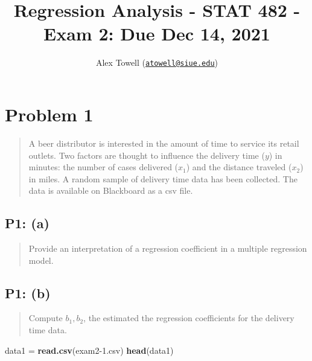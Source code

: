 \documentclass[
]{article}
\title{Regression Analysis - STAT 482 - Exam 2: Due Dec 14, 2021}
\author{Alex Towell
(\href{mailto:atowell@siue.edu}{\nolinkurl{atowell@siue.edu}})}
\date{}
\newenvironment{Shaded}{\begin{snugshade}}{\end{snugshade}}
\newcommand{\FunctionTok}[1]{\textcolor[rgb]{0.13,0.29,0.53}{\textbf{#1}}}
\newcommand{\NormalTok}[1]{#1}
\newcommand{\OtherTok}[1]{\textcolor[rgb]{0.56,0.35,0.01}{#1}}
\newcommand{\StringTok}[1]{\textcolor[rgb]{0.31,0.60,0.02}{#1}}
\begin{document}
\maketitle

\newcommand{\sos}[1]{\mathrm{SS_{#1}}}
\newcommand{\ms}[1]{\mathrm{MS_{#1}}}
\newcommand{\sd}{\operatorname{sd}}
\newcommand{\var}{\operatorname{var}}
\newcommand{\expect}{\operatorname{E}}
\newcommand{\corr}{\operatorname{cor}}
\newcommand{\cov}{\operatorname{cov}}
\newcommand{\se}{\operatorname{se}}
\newcommand{\eval}[2]{\left. #1 \right\vert_{#2}}
\newcommand{\degf}[1]{\mathrm{df_{#1}}}
\newcommand{\entropy}{\operatorname{H}}
\newcommand{\param}[1]{\textcolor{blue}{\texttt{#1}}}
\newcommand{\ci}{\operatorname{CI}}

\hypertarget{problem-1}{%
\section{Problem 1}\label{problem-1}}

\begin{quote}
A beer distributor is interested in the amount of time to service its
retail outlets. Two factors are thought to influence the delivery time
(\(y\)) in minutes: the number of cases delivered (\(x_1\)) and the
distance traveled (\(x_2\)) in miles. A random sample of delivery time
data has been collected. The data is available on Blackboard as a csv
file.
\end{quote}

\hypertarget{p1-a}{%
\subsection{P1: (a)}\label{p1-a}}

\begin{quote}
Provide an interpretation of a regression coefficient in a multiple
regression model.
\end{quote}

\hypertarget{p1-b}{%
\subsection{P1: (b)}\label{p1-b}}

\begin{quote}
Compute \(b_1,b_2\), the estimated the regression coefficients for the
delivery time data.
\end{quote}

\begin{Shaded}
\begin{Highlighting}[]
\NormalTok{data1 }\OtherTok{=} \FunctionTok{read.csv}\NormalTok{(}\StringTok{\textquotesingle{}exam2{-}1.csv\textquotesingle{}}\NormalTok{)}
\FunctionTok{head}\NormalTok{(data1)}
\end{Highlighting}
\end{Shaded}
\end{document}
